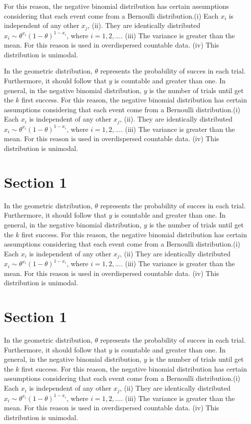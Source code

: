 \documentclass[10pt, a4paper, twocolumn]{ResearchNotes}
\begin{document}
For this reason, the negative binomial distribution has certain assumptions considering that each event come from a Bernoulli distribution.(i) Each $x_i$ is independent of any other $x_j$, (ii). They are identically distributed $x_i\sim\theta^{x_i}(1-\theta)^{1-x_i}$, where $i =1,2,...$. (iii) The variance is greater than the mean. For this reason is used in overdispersed countable data. (iv) This distribution is unimodal.

In the geometric distribution, $\theta$ represents the probability of succes in each trial. Furthermore, it should follow that $y$ is countable and greater than one. In general, in the negative binomial distribution, $y$ is the number of trials until get the $k$ first success. For this reason, the negative binomial distribution has certain assumptions considering that each event come from a Bernoulli distribution.(i) Each $x_i$ is independent of any other $x_j$, (ii). They are identically distributed $x_i\sim\theta^{x_i}(1-\theta)^{1-x_i}$, where $i =1,2,...$. (iii) The variance is greater than the mean. For this reason is used in overdispersed countable data. (iv) This distribution is unimodal.
\section{Section 1}
In the geometric distribution, $\theta$ represents the probability of succes in each trial. Furthermore, it should follow that $y$ is countable and greater than one. In general, in the negative binomial distribution, $y$ is the number of trials until get the $k$ first success. For this reason, the negative binomial distribution has certain assumptions considering that each event come from a Bernoulli distribution.(i) Each $x_i$ is independent of any other $x_j$, (ii) They are identically distributed $x_i\sim\theta^{x_i}(1-\theta)^{1-x_i}$, where $i =1,2,...$. (iii) The variance is greater than the mean. For this reason is used in overdispersed countable data. (iv) This distribution is unimodal.
\section{Section 1}
In the geometric distribution, $\theta$ represents the probability of succes in each trial. Furthermore, it should follow that $y$ is countable and greater than one. In general, in the negative binomial distribution, $y$ is the number of trials until get the $k$ first success. For this reason, the negative binomial distribution has certain assumptions considering that each event come from a Bernoulli distribution.(i) Each $x_i$ is independent of any other $x_j$, (ii) They are identically distributed $x_i\sim\theta^{x_i}(1-\theta)^{1-x_i}$, where $i =1,2,...$. (iii) The variance is greater than the mean. For this reason is used in overdispersed countable data. (iv) This distribution is unimodal.
\end{document}
